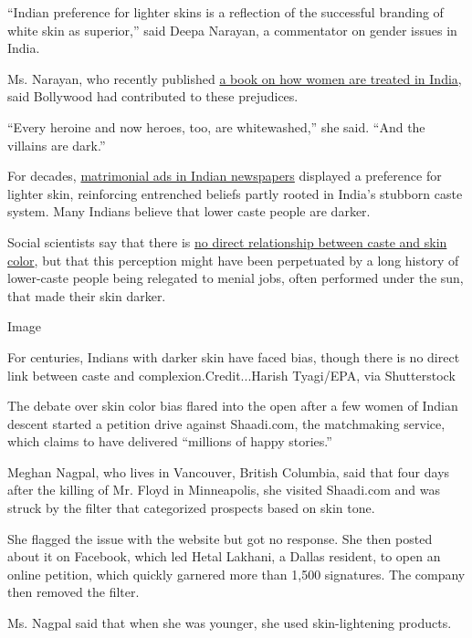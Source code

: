 ``Indian preference for lighter skins is a reflection of the successful
branding of white skin as superior,'' said Deepa Narayan, a commentator
on gender issues in India.

Ms. Narayan, who recently published
\href{https://www.vogue.in/content/deepa-narayan-the-shocking-secrets-i-learned-about-indian-women/}{a
book on how women are treated in India}, said Bollywood had contributed
to these prejudices.

``Every heroine and now heroes, too, are whitewashed,'' she said. ``And
the villains are dark.''

For decades,
\href{https://www.livemint.com/Opinion/KZecVebUGLmPnnbd9uobTP/Matrimonial-ads-reflect-prejudices-Indians-wear-on-their-sle.html}{matrimonial
ads in Indian newspapers} displayed a preference for lighter skin,
reinforcing entrenched beliefs partly rooted in India's stubborn caste
system. Many Indians believe that lower caste people are darker.

Social scientists say that there is
\href{https://openscholarship.wustl.edu/cgi/viewcontent.cgi?article=1553\&context=law_globalstudies}{no
direct relationship between caste and skin color}, but that this
perception might have been perpetuated by a long history of lower-caste
people being relegated to menial jobs, often performed under the sun,
that made their skin darker.

Image

For centuries, Indians with darker skin have faced bias, though there is
no direct link between caste and complexion.Credit...Harish Tyagi/EPA,
via Shutterstock

The debate over skin color bias flared into the open after a few women
of Indian descent started a petition drive against Shaadi.com, the
matchmaking service, which claims to have delivered ``millions of happy
stories.''

Meghan Nagpal, who lives in Vancouver, British Columbia, said that four
days after the killing of Mr. Floyd in Minneapolis, she visited
Shaadi.com and was struck by the filter that categorized prospects based
on skin tone.

She flagged the issue with the website but got no response. She then
posted about it on Facebook, which led Hetal Lakhani, a Dallas resident,
to open an online petition, which quickly garnered more than 1,500
signatures. The company then removed the filter.

Ms. Nagpal said that when she was younger, she used skin-lightening
products.


